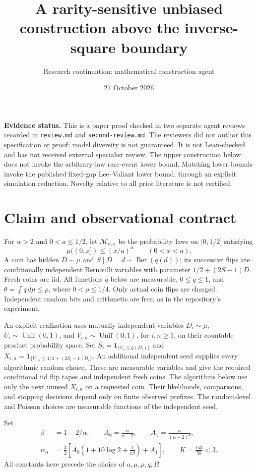 \documentclass[11pt]{article}
\title{A rarity-sensitive unbiased construction above the inverse-square boundary}
\author{Research continuation: mathematical construction agent}
\date{27 October 2026}
\newcommand{\ind}{\mathbf1}
\begin{document}
\maketitle

\noindent\textbf{Evidence status.} This is a paper proof checked in two separate
agent reviews recorded in \texttt{review.md} and \texttt{second-review.md}.
The reviewers did not author this specification or proof; model diversity is
not guaranteed. It is not Lean-checked and has not received external specialist
review. The upper construction below does not invoke the
arbitrary-law rare-event lower bound. Matching lower bounds invoke the published
fixed-gap Lee--Valiant lower bound, through an explicit simulation reduction.
Novelty relative to all prior literature is not certified.

\section{Claim and observational contract}
For $\alpha>2$ and $0<a\le 1/2$, let $\mathcal M_{\alpha,a}$ be the probability
laws on $(0,1/2]$ satisfying
\[
 \mu((0,x])\le (x/a)^\alpha\qquad (0<x<a).
\]
A coin has hidden $D\sim\mu$ and $S\mid D=d\sim\operatorname{Ber}(q(d))$;
its successive flips are conditionally independent Bernoulli variables with
parameter $1/2+(2S-1)D$. Fresh coins are iid. All functions $q$ below are measurable,
$0\le q\le1$, and $\theta=\int q\,d\mu\le\rho$, where $0<\rho\le1/4$.
Only actual coin flips are charged. Independent random bits and arithmetic are
free, as in the repository's experiment.

An explicit realization uses mutually independent variables $D_i\sim\mu$,
$U_i\sim\operatorname{Unif}(0,1)$, and $V_{i,n}\sim\operatorname{Unif}(0,1)$,
for $i,n\ge1$, on their countable product probability space. Set
$S_i=\ind_{\{U_i\le q(D_i)\}}$ and
$X_{i,n}=\ind_{\{V_{i,n}\le1/2+(2S_i-1)D_i\}}$.
An additional independent seed supplies every algorithmic random choice.
These are measurable variables and give the required conditional iid flip
tapes and independent fresh coins. The algorithms below use only the next
unused $X_{i,n}$ on a requested coin. Their likelihoods, comparisons, and
stopping decisions depend only on finite observed prefixes. The random-level
and Poisson choices are measurable functions of the independent seed.

Set
\[
\begin{aligned}
 \beta&=1-2/\alpha,\qquad A_0=\frac{\alpha}{\alpha-2},\qquad
 A_1=\frac{\alpha}{(\alpha-2)^2},\\
 w_\alpha&=\frac32\left[
 A_0\left(1+10\log2+\frac1{e\beta}\right)+A_1\right],
 \qquad K=\frac{153}{56}<3.
\end{aligned}
\]
All constants here precede the choice of $a,\mu,\rho,q,B$.
\end{document}
